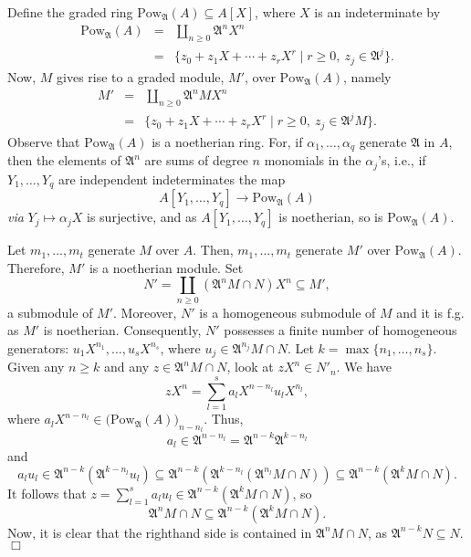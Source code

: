 \documentclass[12pt]{article}
\def\Pow#1#2{\mathrm{Pow}_{#1}(#2)}
\def\mfrac#1{{\mathfrak{#1}}}
\begin{document}
Define the graded ring $\Pow{\mfrac{A}}{A} \subseteq A[X]$,
where $X$ is an indeterminate by
\begin{eqnarray*}
\Pow{\mfrac{A}}{A} & = & \coprod_{n\geq 0} \mfrac{A}^n X^n \\
& = & \{z_0 + z_1 X + \cdots + z_r X^r \mid r\geq 0,\> z_j\in
\mfrac{A}^j\}.
\end{eqnarray*}
Now, $M$ gives rise to a graded module, $M'$, over $\Pow{\mfrac{A}}{A}$,
namely
\begin{eqnarray*}
M' & = &\coprod_{n \geq 0} \mfrac{A}^n M X^n \\
  & = & \{z_0 + z_1 X + \cdots + z_r X^r \mid r\geq 0,\> z_j\in
\mfrac{A}^j M\}.
\end{eqnarray*}
Observe that $\Pow{\mfrac{A}}{A}$ is a noetherian ring. For, if
$\alpha_1, \ldots, \alpha_q$ generate $\mfrac{A}$ in $A$, then the
elements of $\mfrac{A}^n$ are sums of degree $n$ monomials in the
$\alpha_j$'s, i.e., if $Y_1, \ldots, Y_q$ are independent indeterminates
the map
\[
A[Y_1, \ldots, Y_q] \longrightarrow \Pow{\mfrac{A}}{A}
\]
{\it via\/} $Y_j \mapsto \alpha_j X$ is surjective, and as
$A[Y_1, \ldots, Y_q]$ is noetherian, so is $\Pow{\mfrac{A}}{A}$.

\medskip
Let $m_1, \ldots, m_t$ generate $M$ over $A$. Then, $m_1, \ldots,
m_t$ generate $M'$ over  $\Pow{\mfrac{A}}{A}$. Therefore, $M'$ is
a noetherian module. Set
\[
N' = \coprod_{n\geq 0} (\mfrac{A}^n M \cap N)X^n \subseteq M',
\]
a submodule of $M'$.
Moreover, $N'$ is a homogeneous submodule of $M$ and it is f.g.
as $M'$ is noetherian.
Consequently, $N'$ possesses a finite number of homogeneous
generators: $u_1 X^{n_1}, \ldots, u_s X^{n_s}$, where
$u_j \in  \mfrac{A}^{n_j} M \cap N$. Let $k = \max\{n_1, \ldots, n_s\}$.
Given any $n \geq k$ and any $z\in  \mfrac{A}^n M \cap N$, look at
$zX^n \in N'_n$. We have
\[
zX^n = \sum_{l = 1}^s a_l X^{n - n_l} u_l X^{n_l},
\]
where $a_l X^{n - n_l} \in \bigl(\Pow{\mfrac{A}}{A}\bigr)_{n - n_l}$.
Thus,
\[
a_l \in \mfrac{A}^{n - n_l} = \mfrac{A}^{n - k} \mfrac{A}^{k - n_l}
\]
and
\[
a_lu_l \in \mfrac{A}^{n - k} (\mfrac{A}^{k - n_l} u_l) \subseteq
\mfrac{A}^{n - k} (\mfrac{A}^{k - n_l} (\mfrac{A}^{n_l} M \cap N))
\subseteq \mfrac{A}^{n - k} (\mfrac{A}^{k} M \cap N).
\]
It follows that $z = \sum_{l = 1}^s a_l u_l \in
\mfrac{A}^{n - k} (\mfrac{A}^{k} M \cap N)$, so
\[
\mfrac{A}^{n} M \cap N
\subseteq \mfrac{A}^{n - k} (\mfrac{A}^{k} M \cap N).
\]
Now, it is clear that the righthand side is contained in
$\mfrac{A}^{n} M \cap N$, as $\mfrac{A}^{n - k} N \subseteq N$.
$\Box$
\end{document}
